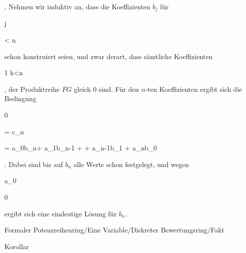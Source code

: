 {{{    }{
}

{   }{
}

}
{}{}{.}
Nehmen wir induktiv an, dass die Koeffizienten $b_j$ für


\mavergleichskette

{\vergleichskette

{j
}

{ < }{ n
}

{  }{
}

{    }{
}

{   }{
}

}
{}{}{}
schon konstruiert seien, und zwar derart, dass sämtliche Koeffizienten

 {}

 {1 \leq k<n} {}

 {} {} {} {,} der Produktreihe $FG$ gleich $0$ sind. Für den $n$-ten Koeffizienten ergibt sich die Bedingung


\mavergleichskettedisp

{\vergleichskette

{ 0
}

{ =} { c_n
}

{ =} { a_0b_n+ a_1b_{n-1} + \cdots + a_{n-1}b_1 + a_nb_0
}

{ } {
}

{ } {
}

}
{}{}{.}
Dabei sind bis auf $b_n$ alle Werte schon festgelegt, und wegen


\mavergleichskette

{\vergleichskette

{a_0
}

{ \neq }{ 0
}

{  }{
}

{    }{
}

{   }{
}

}
{}{}{}
ergibt sich eine eindeutige Lösung für $b_n$.


}



{Formaler Potenzreihenring/Eine Variable/Diskreter Bewertungsring/Fakt}

{Korollar}

{}

{


\faktsituation {}



\faktzusatz {}

\faktzusatz {}


}

